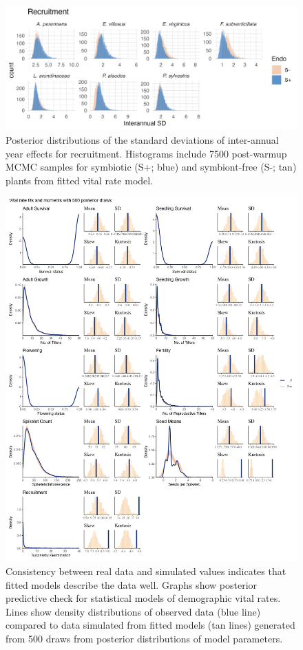 \documentclass[9pt,twoside,lineno]{pnas-new}
\begin{document}
\begin{figure}
	\centering
	\includegraphics[width=.9\linewidth]{recruit_sigmayear_hist.png}
	\caption{Posterior distributions of the standard deviations of inter-annual year effects for recruitment. Histograms include 7500 post-warmup MCMC samples for symbiotic (S+; blue) and symbiont-free (S-; tan) plants from fitted vital rate model.}
\end{figure}
\newpage

\begin{figure}
	\centering
	\includegraphics[width=.7\linewidth]{fitsandmoments_plot.png}
	\caption{Consistency between real data and simulated values indicates that fitted models describe the data well. Graphs show posterior predictive check for statistical models of demographic vital rates. Lines show density distributions of observed data (blue line) compared to data simulated from fitted models (tan lines) generated from 500 draws from posterior distributions of model parameters.}
\end{figure}
\end{document}
